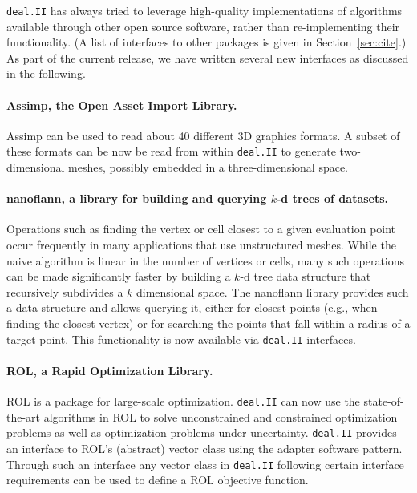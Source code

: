 \documentclass{ansarticle-preprint}
\newcommand{\specialword}[1]{\texttt{#1}}
\newcommand{\dealii}{{\specialword{deal.II}}\xspace}
\begin{document}
\dealii has always tried to leverage high-quality implementations of
algorithms available through other open source software, rather than
re-implementing their functionality. (A list of interfaces to other
packages is given in Section~\ref{sec:cite}.) As part of the current
release, we have written several new interfaces as discussed in the following.

\paragraph*{Assimp, the Open Asset Import Library.}
  Assimp \cite{assimp} can be used to read about 40 different 3D
  graphics formats. A subset of these formats can be now be read from
  within \dealii to generate two-dimensional meshes, possibly embedded in
  a three-dimensional space.


\paragraph*{nanoflann, a library for building and querying
  $k$-d trees of datasets.} Operations such as finding the vertex or cell
  closest to a given evaluation point occur frequently in many applications
  that use unstructured meshes. While the naive algorithm is linear in the
  number of vertices or cells, many such operations can be made significantly
  faster by building a $k$-d tree data structure that recursively subdivides
  a $k$ dimensional space. The nanoflann library \cite{nanoflann} provides
  such a data structure and allows querying it, either for closest points
  (e.g., when finding the closest vertex) or for searching the points that
  fall within a radius of a target point. This functionality is now available
  via \dealii interfaces.

\paragraph*{ROL, a Rapid Optimization Library.}
  ROL \cite{ridzal2014rapid} is a package for large-scale optimization.
  \dealii can now use the state-of-the-art algorithms in ROL to solve
  unconstrained and constrained optimization problems as well as optimization
  problems under uncertainty.
  \dealii provides an interface to ROL's (abstract) vector class using the
  adapter software pattern.
  Through such an interface any vector class in \dealii following certain
  interface requirements can be used to define a ROL objective function.
\end{document}
